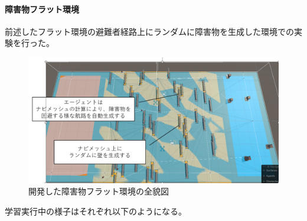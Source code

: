 \documentclass{article}[jsarticle]
\begin{document}
\paragraph{障害物フラット環境}
前述したフラット環境の避難者経路上にランダムに障害物を生成した環境での実験を行った。
\begin{figure}[H]
    \centering
    \includegraphics[scale=0.3]{./images/Field-4.png}
    \caption{
       開発した障害物フラット環境の全貌図
    }
\end{figure}

学習実行中の様子はそれぞれ以下のようになる。
\end{document}
